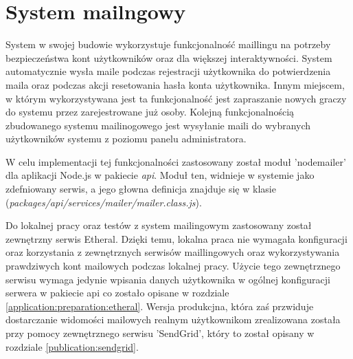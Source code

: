 \label{section:mailling}
\section{System mailngowy}
System w swojej budowie wykorzystuje funkcjonalność maillingu na potrzeby bezpieczeństwa kont użytkowników oraz dla większej interaktywności. System automatycznie wysła maile podczas rejestracji użytkownika do potwierdzenia maila oraz podczas akcji resetowania hasła konta użytkownika. Innym miejscem, w którym wykorzystywana jest ta funkcjonalność jest zapraszanie nowych graczy do systemu przez zarejestrowane już osoby. Kolejną funkcjonalnością zbudowanego systemu mailinogowego jest wysyłanie maili do wybranych użytkowników systemu z poziomu panelu administratora.

W celu implementacji tej funkcjonalności zastosowany został moduł 'nodemailer' dla aplikacji Node.js w pakiecie \textit{api}. Moduł ten, widnieje w systemie jako zdefniowany serwis, a jego głowna definicja znajduje się w klasie (\textit{packages/api/services/mailer/mailer.class.js}).

Do lokalnej pracy oraz testów z system mailingowym zastosowany został zewnętrzny serwis Etheral. Dzięki temu, lokalna praca nie wymagała konfiguracji oraz korzystania z zewnętrznych serwisów maillingowych oraz wykorzystywania prawdziwych kont mailowych podczas lokalnej pracy. Użycie tego zewnętrznego serwisu wymaga jedynie wpisania danych użytkownika w ogólnej konfiguracji serwera w pakiecie api co zostało opisane w rozdziale \ref{application:preparation:etheral}. Wersja produkcjna, która zaś przwiduje dostarczanie widomości mailowych realnym użytkownikom zrealizowana została przy pomocy zewnętrznego serwisu 'SendGrid', który to został opisany w rozdziale \ref{publication:sendgrid}.
